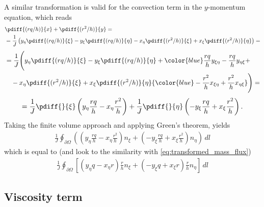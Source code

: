 A similar transformation is valid for the convection term in the $y$-momentum equation, which reads
\begin{align}
    &\pdiff{(rq/h)}{x} + \pdiff{(r^2/h)}{y} =
\\
    &= \frac{1}{J} \left(y_{\eta} \pdiff{(rq/h)}{\xi} - y_{\xi} \pdiff{(rq/h)}{\eta} -x_{\eta} \pdiff{(r^2/h)}{\xi} + x_{\xi} \pdiff{(r^2/h)}{\eta}\right) =
\end{align}
\begin{align}
    \begin{aligned}
        &= \frac{1}{J} \Bigg(y_{\eta} \pdiff{(rq/h)}{\xi} - y_{\xi} \pdiff{(rq/h)}{\eta} + {\color{blue}\frac{rq}{h}  y_{\xi\eta} - \frac{rq}{h} y_{\eta\xi}} +  \\
        &\quad -x_{\eta} \pdiff{(r^2/h)}{\xi} + x_{\xi} \pdiff{(r^2/h)}{\eta} {\color{blue} - \frac{r^2}{h}  x_{\xi\eta} + \frac{r^2}{h} x_{\eta\xi}} \Bigg) =
    \end{aligned}
\end{align}
\begin{align}
    = \frac{1}{J} \pdiff{}{\xi}\left(y_{\eta} \frac{rq}{h} - x_{\eta} \frac{r^2}{h} \right) + \frac{1}{J} \pdiff{}{\eta}\left(-y_{\xi} \frac{rq}{h} + x_{\xi} \frac{r^2}{h} \right).
\end{align}
Taking the finite volume approach and applying Green's theorem, yields
\begin{align}
    \frac{1}{J}\oint_{\partial\Omega} \left(
    \left(y_{\eta} \frac{rq}{h} - x_{\eta} \frac{r^2}{h} \right) n_\xi
    + \left(-y_{\xi} \frac{rq}{h} + x_{\xi} \frac{r^2}{h} \right) n_\eta
     \right)
    \, dl
\end{align}
which is equal to (and look to the similarity with \autoref{eq:transformed_mass_flux})
\begin{align}
    \frac{1}{J}\oint_{\partial\Omega} \left[
    \left(y_{\eta} q - x_{\eta} r \right)\frac{r}{h} n_\xi
    + \left(-y_{\xi} q + x_{\xi} r \right)\frac{r}{h} n_\eta
    \right]
    \, dl
\end{align}
\subsection{Viscosity term}

